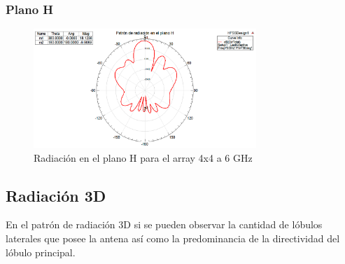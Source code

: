\subsubsection{Plano H}
\begin{figure}[H]
    \centering
        \includegraphics[width=0.75\textwidth]{archivos/analisis/4x42/5}
        \caption{Radiación en el plano H para el array 4x4 a 6 GHz}
        \label{fig:H4x42}
\end{figure}

\subsection{Radiación 3D}
\par En el patrón de radiación 3D si se pueden observar la cantidad de lóbulos laterales que posee la antena así como la predominancia de la directividad del lóbulo principal.

